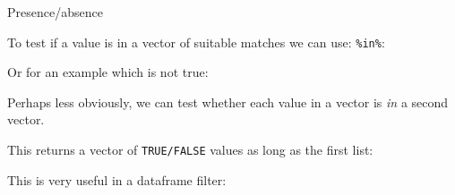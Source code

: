 \documentclass[]{article}
\newenvironment{Shaded}{\begin{snugshade}}{\end{snugshade}}
\newcommand{\DecValTok}[1]{\textcolor[rgb]{0.00,0.00,0.81}{#1}}
\newcommand{\KeywordTok}[1]{\textcolor[rgb]{0.13,0.29,0.53}{\textbf{#1}}}
\newcommand{\NormalTok}[1]{#1}
\newcommand{\OperatorTok}[1]{\textcolor[rgb]{0.81,0.36,0.00}{\textbf{#1}}}
\newcommand{\OtherTok}[1]{\textcolor[rgb]{0.56,0.35,0.01}{#1}}
\newcommand{\StringTok}[1]{\textcolor[rgb]{0.31,0.60,0.02}{#1}}
\begin{document}
Presence/absence

To test if a value is in a vector of suitable matches we can use: \texttt{\%in\%}:

\begin{Shaded}
\end{Shaded}

Or for an example which is not true:

\begin{Shaded}
\end{Shaded}

Perhaps less obviously, we can test whether each value in a vector is \emph{in} a
second vector.

This returns a vector of \texttt{TRUE/FALSE} values as long as the first list:

\begin{Shaded}
\end{Shaded}

This is very useful in a dataframe filter:
\end{document}
